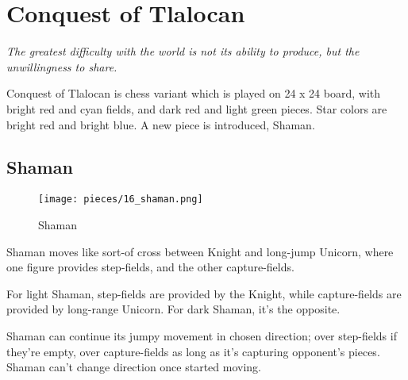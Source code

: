

\chapter*{Conquest of Tlalocan}
\label{ch:Conquest of Tlalocan}

\begin{flushright}
\parbox{0.78\textwidth}{
\emph{The greatest difficulty with the world is not its ability to produce, but the unwillingness to share.\newline
{} } }
\end{flushright}

\noindent
Conquest of Tlalocan is chess variant which is played on 24 x 24 board,
with bright red and cyan fields, and dark red and light green pieces.
Star colors are bright red and bright blue.
A new piece is introduced, Shaman.

\clearpage %

\section*{Shaman}
\label{sec:Conquest of Tlalocan/Shaman}

\vspace*{-0.7\baselineskip}
\noindent
\begin{wrapfigure}[10]{l}{0.4\textwidth}
\centering
\texttt{[image: pieces/16\_shaman.png]}
\vspace*{-1.4\baselineskip}
\caption{Shaman}
\label{fig:16_shaman}
\end{wrapfigure}
Shaman moves like sort-of cross between Knight and long-jump Unicorn,
where one figure provides step-fields, and the other capture-fields.

For light Shaman, step-fields are provided by the Knight, while capture-fields
are provided by long-range Unicorn. For dark Shaman, it's the opposite.

Shaman can continue its jumpy movement in chosen direction; over step-fields
if they're empty, over capture-fields as long as it's capturing opponent's
pieces. Shaman can't change direction once started moving.

